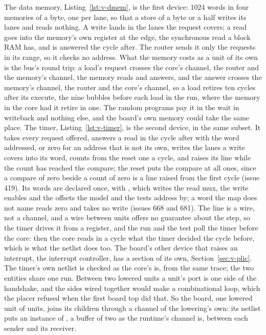 \documentclass[journal,onecolumn,9pt]{IEEEtran}
\begin{document}
The data memory, Listing~\ref{lst:v-dmem}, is the first device:
1024 words in four memories of a byte, one per lane, so that a store
of a byte or a half writes its lanes and reads nothing. A write lands
in the lanes the request covers; a read goes into the memory's own
register at the edge, the synchronous read a block RAM has, and is
answered the cycle after. The router sends it only the requests in
its range, so it checks no address. What the memory costs as a unit
of its own is the bus's round trip: a load's request crosses the
core's channel, the router and the memory's channel, the memory
reads and answers, and the answer crosses the memory's channel, the
router and the core's channel, so a load retires ten cycles after
its execute, the nine bubbles before each load in the run, where the memory in the core had it retire in one. The
random programs pay it in the wait in writeback and nothing else,
and the board's own memory could take the same place. The
timer, Listing~\ref{lst:v-timer}, is the second device, in the
same subset. It takes every request offered,
answers a read in the cycle after with the word addressed, or zero
for an address that is not its own, writes the lanes a write covers
into its word, counts from the reset one a cycle, and raises its
line while the count has reached the compare; the reset puts the
compare at all ones, since a compare of zero beside a count of zero
is a line raised from the first cycle (issue 419). Its words are
declared once, with , which writes the read mux, the
write enables and the offsets the model and the tests address by; a
word the map does not name reads zero and takes no write (issues 668
and 681). The line is a wire,
not a channel, and a wire between units offers no guarantee about the
step, so the timer drives it from a register, and the run and the
test poll the timer before the core: then the core reads in a cycle
what the timer decided the cycle before, which is what the netlist
does too. The board's other device that raises an interrupt, the
interrupt controller, has a section of its own,
Section~\ref{sec:v-plic}. The timer's own netlist is checked as the core's is, from
the same trace; the two entities share one run. Between two lowered
units a unit's port is one side of the handshake, and the sides wired
together would make a combinational loop, which the placer refused
when the first board top did that. So the board, one lowered unit of
units, joins its children through a channel of the lowering's own:
its netlist puts an instance of , a buffer of two
as the runtime's channel is, between each sender and its receiver.
\end{document}
